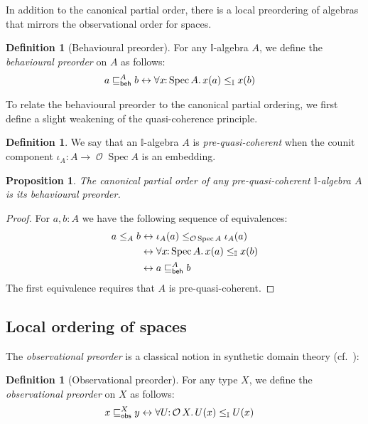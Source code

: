 \documentclass[a4paper,12pt]{amsart}
\newtheorem{proposition}[theorem]{Proposition}
\theoremstyle{definition}
\newtheorem{definition}[theorem]{Definition}
\newcommand{\mc}[1]{\mathcal{#1}}
\newcommand{\mbb}[1]{\mathbb{#1}}
\newcommand{\I}{\mbb I}
\newcommand{\fa}[2]{\forall #1\!\colon\!\!#2\mathpunct{.}}
\newcommand{\eq}{\leftrightarrow}
\newcommand{\spec}{\operatorname{Spec}}
\newcommand{\opens}{\operatorname{\mc{O}}} %
\begin{document}
In addition to the canonical partial order, there is a local preordering of algebras that mirrors the observational order for spaces.

\begin{definition}[Behavioural preorder]
  For any $\I$-algebra $A$, we define the \emph{behavioural preorder} on $A$ as follows:
  \begin{align*}
    a \behle[A] b &\eq \fa{x}{\spec{A}} x(a) \le_{\I} x(b)
  \end{align*}
\end{definition}


To relate the behavioural preorder to the canonical partial ordering, we first define a slight weakening of the quasi-coherence principle.

\begin{definition}
  We say that an $\I$-algebra $A$ is \emph{pre-quasi-coherent} when the counit component $\iota_A\colon A\to \opens\spec{A}$ is an embedding.
\end{definition}

\begin{proposition}\label{lem:canon-beh-coincide}
  The canonical partial order of any pre-quasi-coherent $\I$-algebra $A$ is its behavioural preorder.
\end{proposition}

\begin{proof}
  For $a,b:A$ we have the following sequence of equivalences:
  \begin{align*}
    a\le_A b 
    &\eq \iota_A(a) \le_{\opens\spec{A}} \iota_A(a)
    \\ 
    &\eq \fa{x}{\spec{A}} x(a) \le_{\I} x(b)
    \\ 
    &\eq a\behle[A]b
  \end{align*}
  The first equivalence requires that $A$ is pre-quasi-coherent.
\end{proof}


\subsection{Local ordering of spaces}

The \emph{observational preorder} is a classical notion in synthetic domain theory (cf.\ \citet{PhoaWesleyKym-Son1991DtiR,hyland1990first}):

\begin{definition}[Observational preorder]\label{defn:specialisation}
  For any type $X$, we define the \emph{observational preorder} on $X$ as follows:
  \begin{align*}
    x\obsle[X] y 
    &\eq \fa{U}{\opens{X}} U(x)\le_\I U(x)
  \end{align*}
\end{definition}
\end{document}
